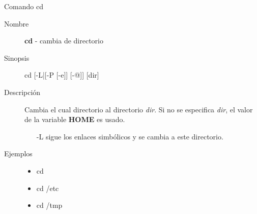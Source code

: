 \begin{frame}[c]{Comando cd}
  \begin{description}
    \item[Nombre]
      \textbf{cd} - cambia de directorio

    \vspace{\baselineskip}
    \item[Sinopsis]
      cd [-L|[-P [-e]] [-@]] [dir]

    \vspace{\baselineskip}
    \item[Descripción]
      Cambia el cual directorio al directorio \emph{dir}. Si no se
      especifica \emph{dir}, el valor de la variable \textbf{HOME} es usado.

      \begin{itemize}
        \item [-L] sigue los enlaces simbólicos y se cambia a este
          directorio.
      \end{itemize}

    \vspace{\baselineskip}
    \item[Ejemplos]
      \begin{itemize}
        \item cd
        \item cd /etc
        \item cd /tmp
      \end{itemize}
  \end{description}
\end{frame}

